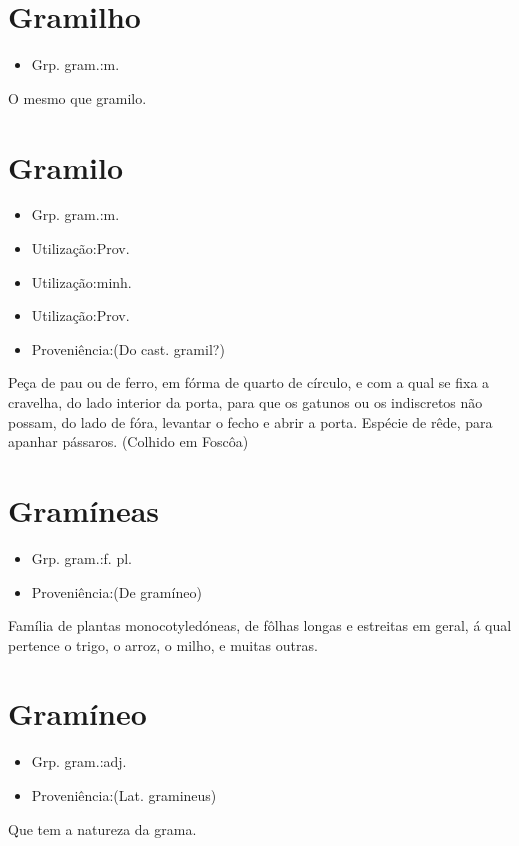 \section{Gramilho}
\begin{itemize}
\item {Grp. gram.:m.}
\end{itemize}
O mesmo que \textunderscore gramilo\textunderscore .
\section{Gramilo}
\begin{itemize}
\item {Grp. gram.:m.}
\end{itemize}
\begin{itemize}
\item {Utilização:Prov.}
\end{itemize}
\begin{itemize}
\item {Utilização:minh.}
\end{itemize}
\begin{itemize}
\item {Utilização:Prov.}
\end{itemize}
\begin{itemize}
\item {Proveniência:(Do cast. \textunderscore gramil\textunderscore ?)}
\end{itemize}
Peça de pau ou de ferro, em fórma de quarto de círculo, e com a qual se fixa a cravelha, do lado interior da porta, para que os gatunos ou os indiscretos não possam, do lado de fóra, levantar o fecho e abrir a porta.
Espécie de rêde, para apanhar pássaros. (Colhido em Foscôa)
\section{Gramíneas}
\begin{itemize}
\item {Grp. gram.:f. pl.}
\end{itemize}
\begin{itemize}
\item {Proveniência:(De \textunderscore gramíneo\textunderscore )}
\end{itemize}
Família de plantas monocotyledóneas, de fôlhas longas e estreitas em geral, á qual pertence o trigo, o arroz, o milho, e muitas outras.
\section{Gramíneo}
\begin{itemize}
\item {Grp. gram.:adj.}
\end{itemize}
\begin{itemize}
\item {Proveniência:(Lat. \textunderscore gramineus\textunderscore )}
\end{itemize}
Que tem a natureza da grama.
